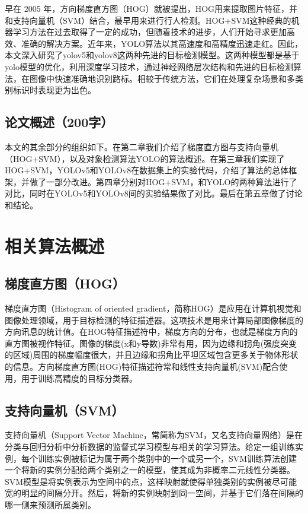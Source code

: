 \documentclass{article}
\begin{document}
早在 2005 年，方向梯度直方图（HOG）就被提出，HOG用来提取图片特征，并和支持向量机（SVM）结合，最早用来进行行人检测。HOG+SVM这种经典的机器学习方法在过去取得了一定的成功，但随着技术的进步，人们开始寻求更加高效、准确的解决方案。近年来，YOLO算法以其高速度和高精度迅速走红。因此，本文深入研究了yolov5和yolov8这两种先进的目标检测模型。这两种模型都是基于yolo模型的优化，利用深度学习技术，通过神经网络层次结构和先进的目标检测算法，在图像中快速准确地识别路标。相较于传统方法，它们在处理复杂场景和多类别标识时表现更为出色。

\subsection{论文概述（200字）}
本文的其余部分的组织如下。在第二章我们介绍了梯度直方图与支持向量机（HOG+SVM），以及对象检测算法YOLO的算法概述。在第三章我们实现了HOG+SVM，YOLOv5和YOLOv8在数据集上的实验代码，介绍了算法的总体框架，并做了一部分改进。第四章分别对HOG+SVM，和YOLO的两种算法进行了对比，同时在YOLOv5和YOLOv8间的实验结果做了对比。最后在第五章做了讨论和结论。

\section{相关算法概述}
\subsection{梯度直方图（HOG）}
梯度直方图（Histogram of oriented gradient，简称HOG）是应用在计算机视觉和图像处理领域，用于目标检测的特征描述器。这项技术是用来计算局部图像梯度的方向讯息的统计值。在HOG特征描述符中，梯度方向的分布，也就是梯度方向的直方图被视作特征。图像的梯度(x和y导数)非常有用，因为边缘和拐角(强度突变的区域)周围的梯度幅度很大，并且边缘和拐角比平坦区域包含更多关于物体形状的信息。方向梯度直方图(HOG)特征描述符常和线性支持向量机(SVM)配合使用，用于训练高精度的目标分类器。

\subsection{支持向量机（SVM）}
支持向量机（Support Vector Machine，常简称为SVM，又名支持向量网络）是在分类与回归分析中分析数据的监督式学习模型与相关的学习算法。给定一组训练实例，每个训练实例被标记为属于两个类别中的一个或另一个，SVM训练算法创建一个将新的实例分配给两个类别之一的模型，使其成为非概率二元线性分类器。SVM模型是将实例表示为空间中的点，这样映射就使得单独类别的实例被尽可能宽的明显的间隔分开。然后，将新的实例映射到同一空间，并基于它们落在间隔的哪一侧来预测所属类别。
\end{document}
